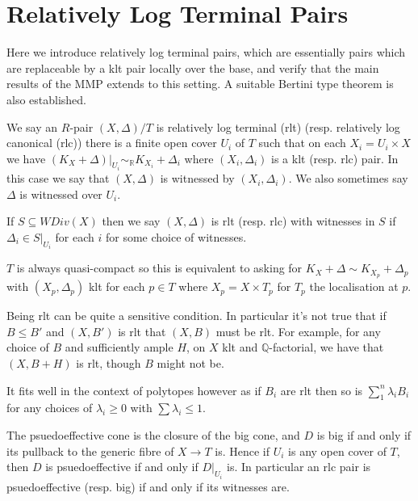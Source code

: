 \documentclass[a4paper,12pt]{amsart}
\begin{document}
	
	
	\section{Relatively Log Terminal Pairs} \label{rlt-section}


	Here we introduce relatively log terminal pairs, which are essentially pairs which are replaceable by a klt pair locally over the base, and verify that the main results of the MMP extends to this setting. A suitable Bertini type theorem is also established.
	
	\begin{definition}
		We say an $R$-pair $(X,\Delta)/T$ is relatively log terminal (rlt) (resp. relatively log canonical (rlc)) there is a finite open cover $U_{i}$ of $T$ such that on each $X_{i}=U_{i} \times X$ we have $(K_{X}+\Delta)|_{U_{i}} \sim_{\mathbb{R}} K_{X_{i}}+\Delta_{i}$ where $(X_{i},\Delta_{i})$ is a klt (resp. rlc) pair. In this case we say that $(X,\Delta)$ is witnessed by $(X_{i},\Delta_{i})$. We also sometimes say $\Delta$ is witnessed over $U_{i}$. 
		
		If $S \subseteq WDiv(X)$ then we say $(X,\Delta)$ is rlt (resp. rlc) with witnesses in $S$ if $\Delta_{i} \in S|_{U_{i}}$ for each $i$ for some choice of witnesses.
	\end{definition}
	\begin{remark}
		$T$ is always quasi-compact so this is equivalent to asking for $K_{X}+\Delta \sim K_{X_{p}}+\Delta_{p}$ with $(X_{p},\Delta_{p})$ klt for each $p \in T$ where $X_{p}=X \times T_{p}$ for $T_{p}$ the localisation at $p$.
	\end{remark}
	
	Being rlt can be quite a sensitive condition. In particular it's not true that if $B \leq B'$ and $(X,B')$ is rlt that $(X,B)$ must be rlt. For example, for any choice of $B$ and sufficiently ample $H$, on $X$ klt and $\mathbb{Q}$-factorial, we have that $(X,B+H)$ is rlt, though $B$ might not be.
	
	It fits well in the context of polytopes however as if $B_{i}$ are rlt then so is $\sum_{1}^{n} \lambda_{i}B_{i}$ for any choices of $\lambda_{i} \geq 0$ with $\sum \lambda_{i} \leq 1$.
	
	The psuedoeffective cone is the closure of the big cone, and $D$ is big if and only if its pullback to the generic fibre of $X \to T$ is. Hence if $U_{i}$ is any open cover of $T$, then $D$ is psuedoeffective if and only if $D|_{U_{i}}$ is. In particular an rlc pair is psuedoeffective (resp. big) if and only if its witnesses are.
	
\end{document}
